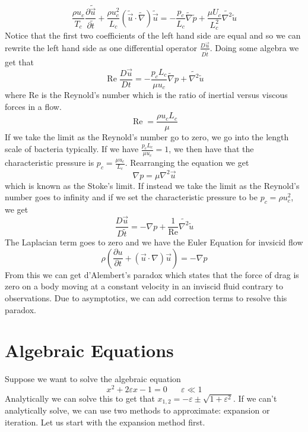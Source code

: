 \documentclass{article}
\newcommand{\pd}[2]{\frac{\partial #1}{\partial #2}}
\newcommand{\twen}{\hspace{20pt}}
\begin{document}
\begin{equation*}
    \frac{\rho u_c}{T_c} \pd{\tilde{ \vec{u}}}{\tilde t} + \frac{\rho u_c^2}{L_c} \left(\tilde{\vec{u}} \cdot \tilde{\nabla} \right)\tilde{\vec{u}} = -\frac{p_c}{L_c} \tilde{\nabla} \tilde p + \frac{\mu U_c}{L_c^2}\tilde{\nabla ^2}\tilde u
\end{equation*}
Notice that the first two coefficients of the left hand side are equal and so we can rewrite the left hand side as one differential operator $\frac{D\vec{u}}{D\tilde t}$. Doing some algebra we get that 
\begin{equation*}
    \operatorname{Re}\frac{D\vec{u}}{Dt} = -\frac{p_c L_c}{\mu u_c} \tilde{\nabla}p + \tilde{\nabla^2}\tilde u
\end{equation*}
where Re is the Reynold's number which is the ratio of inertial versus viscous forces in a flow. 
\begin{equation*}
    \operatorname{Re} = \frac{\rho u_c L_c}{\mu}
\end{equation*}
If we take the limit as the Reynold's number go to zero, we go into the length scale of bacteria typically. If we have $\frac{p_cL_c}{\mu u_c} = 1$, we then have that the characteristic pressure is $p_c =\frac{\mu u_c}{L_c}$. Rearranging the equation we get 
\begin{equation*}
    \nabla p= \mu \nabla^2 \vec{u}
\end{equation*}
which is known as the Stoke's limit. If instead we take the limit as the Reynold's number goes to infinity and if we set the characteristic pressure to be $p_c=\rho u_c^2$, we get 
\begin{equation*}
    \frac{D \vec{u}}{D\tilde{t}} = -\nabla p +\frac{1}{\operatorname{Re}}\tilde{\nabla^2}\tilde u
\end{equation*}
The Laplacian term goes to zero and we have the Euler Equation for invsicid flow 
\begin{equation*}
    \rho\left( \pd{u}{t}+(\vec{u} \cdot \nabla) \vec{u} \right) = -\nabla p
\end{equation*}
From this we can get d'Alembert's paradox which states that the force of drag is zero on a body moving at a constant velocity in an inviscid fluid contrary to observations. Due to asymptotics, we can add correction terms to resolve this paradox.
\section{Algebraic Equations}
Suppose we want to solve the algebraic equation 
\begin{equation*}
    x^2+2\varepsilon x-1=0 \twen \varepsilon\ll 1
\end{equation*}
Analytically we can solve this to get that $x_{1,2}=-\varepsilon\pm \sqrt{1+\varepsilon^2}$. If we can't analytically solve, we can use two methods to approximate: expansion or iteration. Let us start with the expansion method first.
\end{document}
